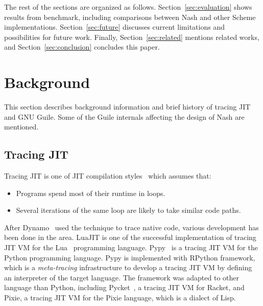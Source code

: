 \documentclass[preprint, 10pt]{sigplanconf}
\begin{document}
The rest of the sections are organized as follows.
Section~\hyperref[sec:evaluation]{\ref{sec:evaluation}} shows results from
benchmark, including comparisons between Nash and other Scheme
implementations. Section~\hyperref[sec:conclusion]{\ref{sec:future}} discusses
current limitations and possibilities for future work. Finally,
Section~\hyperref[sec:related]{\ref{sec:related}} mentions related works, and
Section~\hyperref[sec:conclusion]{\ref{sec:conclusion}} concludes this paper.

\section{Background}
\label{sec:background}

This section describes background information and brief history of tracing JIT
and GNU Guile. Some of the Guile internals affecting the design of Nash are
mentioned.

\subsection{Tracing JIT}
Tracing JIT is one of JIT compilation styles~\cite{bolz2009tracing} which
assumes that:

\begin{itemize}
\item Programs spend most of their runtime in loops.
\item Several iterations of the same loop are likely to take similar code
  paths.
\end{itemize}

After Dynamo~\cite{bala2000dynamo} used the technique to trace native code,
various development has been done in the area. LuaJIT is one of the successful
implementation of tracing JIT VM for the Lua~\cite{ierusalimschy1996lua}
programming language. Pypy~\cite{bolz2009tracing} is a tracing JIT VM for the
Python programming language. Pypy is implemented with RPython framework, which
is a \textit{meta-tracing} infrastructure to develop a tracing JIT VM by
defining an interpreter of the target language. The framework was adapted to
other language than Python, including Pycket~\citep{bauman2015pycket}, a
tracing JIT VM for Racket, and Pixie, a tracing JIT VM for the Pixie language,
which is a dialect of Lisp.
\end{document}
